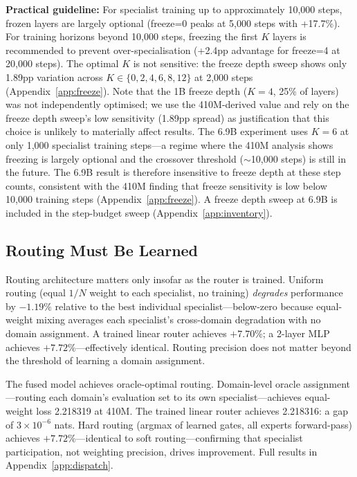 \documentclass{article}
\begin{document}
\textbf{Practical guideline:} For specialist training up to approximately 10,000 steps, frozen layers are largely optional (freeze=0 peaks at 5,000 steps with +17.7\%). For training horizons beyond 10,000 steps, freezing the first $K$ layers is recommended to prevent over-specialisation (+2.4pp advantage for freeze=4 at 20,000 steps). The optimal $K$ is not sensitive: the freeze depth sweep shows only 1.89pp variation across $K \in \{0, 2, 4, 6, 8, 12\}$ at 2,000 steps (Appendix~\ref{app:freeze}). Note that the 1B freeze depth ($K=4$, 25\% of layers) was not independently optimised; we use the 410M-derived value and rely on the freeze depth sweep's low sensitivity (1.89pp spread) as justification that this choice is unlikely to materially affect results. The 6.9B experiment uses $K=6$ at only 1,000 specialist training steps---a regime where the 410M analysis shows freezing is largely optional and the crossover threshold ($\sim$10,000 steps) is still in the future. The 6.9B result is therefore insensitive to freeze depth at these step counts, consistent with the 410M finding that freeze sensitivity is low below 10,000 training steps (Appendix~\ref{app:freeze}). A freeze depth sweep at 6.9B is included in the step-budget sweep (Appendix~\ref{app:inventory}).

\subsection{Routing Must Be Learned}
\label{sec:failure}

Routing architecture matters only insofar as the router is trained. Uniform routing (equal $1/N$ weight to each specialist, no training) \emph{degrades} performance by $-1.19\%$ relative to the best individual specialist---below-zero because equal-weight mixing averages each specialist's cross-domain degradation with no domain assignment. A trained linear router achieves $+7.70\%$; a 2-layer MLP achieves $+7.72\%$---effectively identical. Routing precision does not matter beyond the threshold of learning a domain assignment.

The fused model achieves oracle-optimal routing. Domain-level oracle assignment---routing each domain's evaluation set to its own specialist---achieves equal-weight loss 2.218319 at 410M. The trained linear router achieves 2.218316: a gap of $3 \times 10^{-6}$ nats. Hard routing (argmax of learned gates, all experts forward-pass) achieves $+7.72\%$---identical to soft routing---confirming that specialist participation, not weighting precision, drives improvement. Full results in Appendix~\ref{app:dispatch}.
\end{document}
